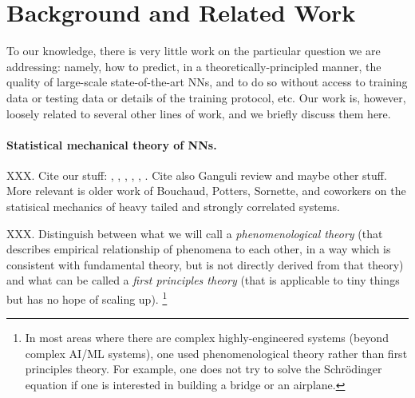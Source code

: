 \section{Background and Related Work}
\label{sxn:background}


To our knowledge, there is very little work on the particular question we are addressing: namely, how to predict, in a theoretically-principled manner, the quality of large-scale state-of-the-art NNs, and to do so without access to training data or testing data or details of the training protocol, etc.
Our work is, however, loosely related to several other lines of work, and we briefly discuss them here.

\paragraph{Statistical mechanical theory of NNs.}

XXX.
Cite our stuff:
\cite{MM17_TR},
\cite{MM18_TR},
\cite{MM19_HTSR_ICML},
\cite{weightwatcher_package}
\cite{MM19_KDD},
\cite{MM20_SDM},
\cite{MM20_unpub_work}.
Cite also Ganguli review and maybe other stuff.
More relevant is older work of Bouchaud, Potters, Sornette, and coworkers \cite{BouchaudPotters03, SornetteBook, BP11, bun2017} on the statisical mechanics of heavy tailed and strongly correlated systems.

XXX.
Distinguish between what we will call a
\emph{phenomenological theory}
(that describes empirical relationship of phenomena to each other, in a way which is consistent with fundamental theory, but is not directly derived from that theory)
and what can be called a 
\emph{first principles theory} 
(that is applicable to tiny things but has no hope of scaling up).
\footnote{In most areas where there are complex highly-engineered systems (beyond complex AI/ML systems), one used phenomenological theory rather than first principles theory.  For example, one does not try to solve the Schr\"odinger equation if one is interested in building a bridge or an airplane.}

